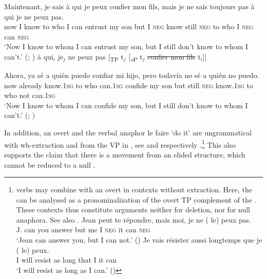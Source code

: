 \documentclass[output=paper,colorlinks,citecolor=brown,]{langsci/langscibook}
\begin{document}
\begin{exe}
\ex \label{8}
\begin{xlist}
\ex \label{8a}\gll Maintenant, je sais à qui je peux confier mon fils, mais je ne sais toujours pas  à qui je ne peux pas. \\
now I know to who I can entrust my son but I \textsc{neg} know still \textsc{neg} to who I \textsc{neg} can \textsc{neg} \\
\glt `Now I know to whom I can entrust my son, but I still don't know to whom I can't.'	\hfill (; \citealt{Dagnac2010})
\ex {\ldots}{} à qui$_{i}$ je$_{j}$  ne peux pas [\textsubscript{TP} t$_{j}$ [\textsubscript{\textit{v}P} t$_{j}$  \sout{confier mon fils} t$_{i}$]]
\end{xlist}

\ex \label{9}
\gll Ahora, ya sé a quién puedo confiar mi hijo, pero todavía no sé a quién no puedo.\\
now already know.\textsc{1sg} to who can.\textsc{1sg} confide my son but still \textsc{neg} know.\textsc{1sg} to who not can.\textsc{1sg}\\
\glt `Now I know to whom I can confide my son, but I still don't know to whom I can't.' \hfill (; \citealt{Dagnac2010})
\end{exe}

\noindent In addition, an overt  and the verbal anaphor le faire `do it' are ungrammatical with wh-extraction and  from the VP in , see  and  respectively \citep{Dagnac2008}.\footnote{  verbs may combine with an overt  in contexts without extraction. Here, the  can be analysed as a pronominalization of the overt TP complement of the  . These contexts thus constitute arguments neither for deletion, nor for null anaphora. See also .
\ea \gll Jean peut te répondre, mais moi, je ne (\hspace{-2pt} le) peux pas.\\
J. can  you answer  but me  I  \textsc{neg} {} it can  \textsc{neg} \\
\glt `Jean can answer you, but I can not.' \hfill ()\z
\ea \gll Je vais résister aussi longtemps que je (\hspace{-2pt} le) peux.\\
I   will resist as   long that  I   {} it  can\\
\glt `I will resist as long as I can.' \hfill ()\z\label{fn:3}} This also supports the claim that there is a movement from an elided structure, which cannot be reduced to a null .
\end{document}
